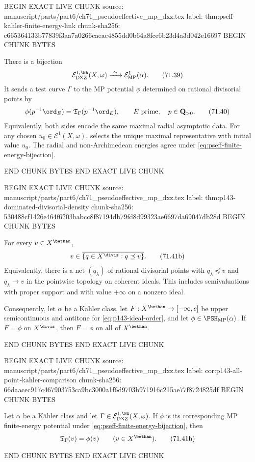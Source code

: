 BEGIN EXACT LIVE CHUNK
source: manuscript/parts/part6/ch71_pseudoeffective_mp_dxz.tex
label: thm:pseff-kahler-finite-energy-link
chunk-sha256: c665364133b77839f3aa7a0266caeac4855dd0b64a8fce6b23d4a3d042e16697
BEGIN CHUNK BYTES
\begin{theorem}\label{thm:pseff-kahler-finite-energy-link}
There is a bijection
\[
 \mathcal E^{1,\NA}_{\mathrm{DXZ}}(X,\omega)
 \xrightarrow{\ \sim\ }
 \mathcal E^1_{\mathrm{MP}}(\alpha).
\tag{71.39}\label{eq:pseff-finite-energy-bijection}
\]
It sends a test curve \(\Gamma\) to the MP potential \(\phi\) determined
on rational divisorial points by
\[
 \phi(p^{-1}\ord_E)
 =\mathfrak T_\Gamma(p^{-1}\ord_E),
 \qquad E\text{ prime},\quad p\in\mathbf Q_{>0}.
\tag{71.40}\label{eq:pseff-finite-energy-divisorial-link}
\]
Equivalently, both sides encode the same maximal radial asymptotic data.
For any chosen \(u_0\in\mathcal E^1(X,\omega)\),
 selects the unique maximal representative with
initial value \(u_0\).  The radial and non-Archimedean energies agree under
\eqref{eq:pseff-finite-energy-bijection}.
\end{theorem}
END CHUNK BYTES
END EXACT LIVE CHUNK

BEGIN EXACT LIVE CHUNK
source: manuscript/parts/part6/ch71_pseudoeffective_mp_dxz.tex
label: thm:p143-dominated-divisorial-density
chunk-sha256: 530488cf1426e464f6203babcc8f87194db79fd8d99323ae6697da69047db28d
BEGIN CHUNK BYTES
\begin{theorem}\label{thm:p143-dominated-divisorial-density}
For every \(v\in X^{\bethan}\),
\[
 v\in\overline{\{q\in X^{\divis}:q\preceq v\}}.
\tag{71.41b}\label{eq:p143-dominated-divisorial-density}
\]
Equivalently, there is a net \((q_\lambda)\) of rational divisorial
points with \(q_\lambda\preceq v\) and \(q_\lambda\to v\) in the
pointwise topology on coherent ideals.  This includes semivaluations with
proper support and with value \(+\infty\) on a nonzero ideal.

Consequently, let \(\alpha\) be a K\"ahler class, let
\(F:X^{\bethan}\to[-\infty,c]\) be upper semicontinuous and antitone for
\eqref{eq:p143-ideal-order}, and let \(\phi\in\PSH_{\mathrm{MP}}(\alpha)\).
If \(F=\phi\) on \(X^{\divis}\), then \(F=\phi\) on all of
\(X^{\bethan}\).
\end{theorem}
END CHUNK BYTES
END EXACT LIVE CHUNK

BEGIN EXACT LIVE CHUNK
source: manuscript/parts/part6/ch71_pseudoeffective_mp_dxz.tex
label: cor:p143-all-point-kahler-comparison
chunk-sha256: 66daacec917c467903753ca9bc3000a1f6d9703b971916c215ae77f8724825df
BEGIN CHUNK BYTES
\begin{corollary}\label{cor:p143-all-point-kahler-comparison}
Let \(\alpha\) be a K\"ahler class and let
\(\Gamma\in\mathcal E^{1,\NA}_{\mathrm{DXZ}}(X,\omega)\).  If \(\phi\)
is its corresponding MP finite-energy potential under
\eqref{eq:pseff-finite-energy-bijection}, then
\[
 \mathfrak T_\Gamma(v)=\phi(v)
 \qquad(v\in X^{\bethan}).
\tag{71.41h}\label{eq:p143-all-point-kahler-comparison}
\]
\end{corollary}
END CHUNK BYTES
END EXACT LIVE CHUNK

